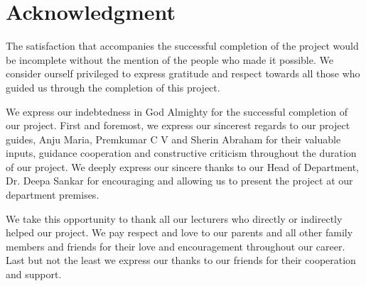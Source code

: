 \chapter*{Acknowledgment}
The satisfaction that accompanies the successful completion of the project would be incomplete without the mention of the people who made it possible. We consider ourself privileged to express gratitude and respect towards all those who guided us through the completion of this project.

We express our indebtedness in God Almighty for the successful completion of our project. First and foremost, we express our sincerest regards to our project guides, Anju Maria, Premkumar C V and Sherin Abraham for their valuable inputs, guidance cooperation and constructive criticism throughout the duration of our project. We deeply express our sincere thanks to our Head of Department, Dr. Deepa Sankar for encouraging and allowing us to present the project at our department premises.

We take this opportunity to thank all our lecturers who directly or indirectly helped our project. We pay respect and love to our parents and all other family members and friends for their love and encouragement throughout our career. Last but not the least we express our thanks to our friends for their cooperation and support.

\inspage